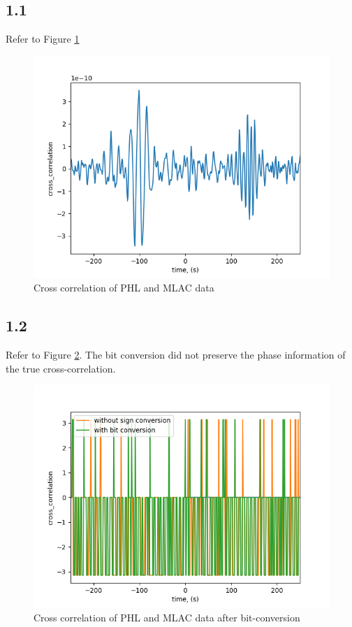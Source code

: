 \subsection*{1.1}

Refer to Figure \ref{fig:part1_1}
\begin{figure}[]
	\caption{Cross correlation of PHL and MLAC data}
	\label{fig:part1_1}
	\includegraphics[width=\linewidth]{figures/part1_1a.png}
\end{figure}


\subsection*{1.2}

Refer to Figure \ref{fig:part1_2}. The bit conversion did not preserve the phase information of the true cross-correlation. 
\begin{figure}[]
	\caption{Cross correlation of PHL and MLAC data after bit-conversion}
	\label{fig:part1_2}
	\includegraphics[width=\linewidth]{figures/part1_2b.png}
\end{figure}
